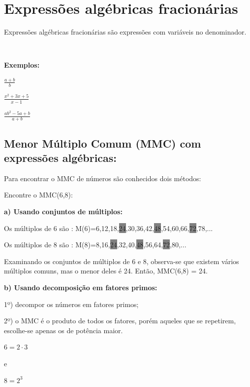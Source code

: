 \section{Expressões algébricas fracionárias}

Expressões algébricas fracionárias são expressões com variáveis no denominador.

~~

\textbf{Exemplos:}
\begin{multicols}{3}
\begin{enumerate}[label=\arabic*)]{\large
\item $\frac{a+b}{b}$

\item $\frac{x^2+3x+5}{x-1}$

\item $\frac{ab^2-5a+b}{a+b}$

}\end{enumerate}
\end{multicols}

\subsection{Menor Múltiplo Comum (MMC) com expressões algébricas:}

Para encontrar o MMC de números são conhecidos dois métodos:

Encontre o MMC(6,8):

\noindent\textbf{a) Usando conjuntos de múltiplos:}

Os múltiplos de 6 são : M(6)={6,12,18,\colorbox{gray}{24},30,36,42,\colorbox{gray}{48},54,60,66,\colorbox{gray}{72},78,...}

Os múltiplos de 8 são : M(8)={8,16,\colorbox{gray}{24},32,40,\colorbox{gray}{48},56,64,\colorbox{gray}{72},80,...}

Examinando os conjuntos de múltiplos de 6 e 8, observa-se que existem vários múltiplos comuns, mas o menor deles é 24. Então, MMC(6,8) = 24.

\noindent\textbf{b) Usando decomposição em fatores primos:}
    
1º) decompor os números em fatores primos;

2º) o MMC é o produto de todos os fatores, porém aqueles que se repetirem, escolhe-se apenas os de potência maior. 

\begin{multicols}{3}
$6 = 2 \cdot 3$

e

$8 = 2^3$
\end{multicols}

